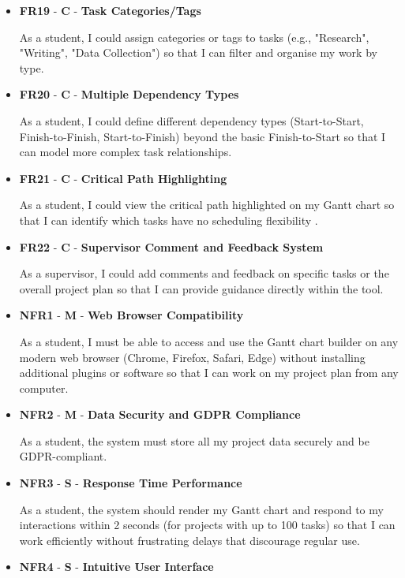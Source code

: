 \documentclass[12pt,nonacm,acmlarge,titlepage,screen]{acmart}
\begin{document}
\begin{itemize}
    As a student, I could have an alternative Kanban board view of my tasks so that I can visualise my work in a different format that shows current work in progress.
    \item	\textbf{	FR19	}	-	\textbf{	C	}	-	\textbf{	Task Categories/Tags	}		
    
    As a student, I could assign categories or tags to tasks (e.g., "Research", "Writing", "Data Collection") so that I can filter and organise my work by type.
    \item	\textbf{	FR20	}	-	\textbf{	C	}	-	\textbf{	Multiple Dependency Types	}		
    
    As a student, I could define different dependency types (Start-to-Start, Finish-to-Finish, Start-to-Finish) beyond the basic Finish-to-Start so that I can model more complex task relationships.
    \item	\textbf{	FR21	}	-	\textbf{	C	}	-	\textbf{	Critical Path Highlighting \cite{besner_2008}	}		
    
    As a student, I could view the critical path highlighted on my Gantt chart so that I can identify which tasks have no scheduling flexibility \cite{besner_2008}.
    \item	\textbf{	FR22	}	-	\textbf{	C	}	-	\textbf{	Supervisor Comment and Feedback System	}		
    
    As a supervisor, I could add comments and feedback on specific tasks or the overall project plan so that I can provide guidance directly within the tool.
    \item	\textbf{	NFR1	}	-	\textbf{	M	}	-	\textbf{	Web Browser Compatibility	}		
    
    As a student, I must be able to access and use the Gantt chart builder on any modern web browser (Chrome, Firefox, Safari, Edge) without installing additional plugins or software so that I can work on my project plan from any computer.
    
    \item	\textbf{	NFR2	}	-	\textbf{	M	}	-	\textbf{	Data Security and GDPR Compliance	}		
    
    As a student, the system must store all my project data securely and be GDPR-compliant.
    \item	\textbf{	NFR3	}	-	\textbf{	S	}	-	\textbf{	Response Time Performance	}		
    
    As a student, the system should render my Gantt chart and respond to my interactions within 2 seconds (for projects with up to 100 tasks) so that I can work efficiently without frustrating delays that discourage regular use.
    \item	\textbf{	NFR4	}	-	\textbf{	S	}	-	\textbf{	Intuitive User Interface	}		
    

\end{itemize}
\end{document}
